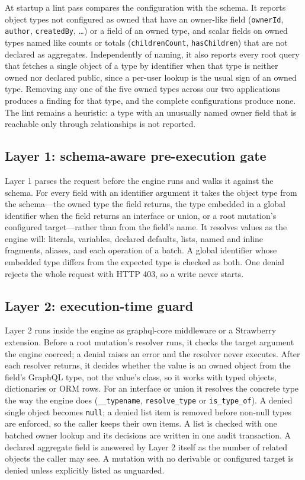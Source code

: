\documentclass[conference]{IEEEtran}
\newcommand{\code}[1]{\texttt{\small #1}}
\begin{document}
At startup a lint pass compares the configuration with the schema. It reports object types not configured as owned that have an owner-like field (\code{ownerId}, \code{author}, \code{createdBy}, \ldots) or a field of an owned type, and scalar fields on owned types named like counts or totals (\code{childrenCount}, \code{hasChildren}) that are not declared as aggregates. Independently of naming, it also reports every root query that fetches a single object of a type by identifier when that type is neither owned nor declared public, since a per-user lookup is the usual sign of an owned type. Removing any one of the five owned types across our two applications produces a finding for that type, and the complete configurations produce none. The lint remains a heuristic: a type with an unusually named owner field that is reachable only through relationships is not reported.

\subsection{Layer 1: schema-aware pre-execution gate}
Layer 1 parses the request before the engine runs and walks it against the schema. For every field with an identifier argument it takes the object type from the schema---the owned type the field returns, the type embedded in a global identifier when the field returns an interface or union, or a root mutation's configured target---rather than from the field's name. It resolves values as the engine will: literals, variables, declared defaults, lists, named and inline fragments, aliases, and each operation of a batch. A global identifier whose embedded type differs from the expected type is checked as both. One denial rejects the whole request with HTTP 403, so a write never starts.

\subsection{Layer 2: execution-time guard}
Layer 2 runs inside the engine as graphql-core middleware or a Strawberry extension. Before a root mutation's resolver runs, it checks the target argument the engine coerced; a denial raises an error and the resolver never executes. After each resolver returns, it decides whether the value is an owned object from the field's GraphQL type, not the value's class, so it works with typed objects, dictionaries or ORM rows. For an interface or union it resolves the concrete type the way the engine does (\code{\_\_typename}, \code{resolve\_type} or \code{is\_type\_of}). A denied single object becomes \code{null}; a denied list item is removed before non-null types are enforced, so the caller keeps their own items. A list is checked with one batched owner lookup and its decisions are written in one audit transaction. A declared aggregate field is answered by Layer 2 itself as the number of related objects the caller may see. A mutation with no derivable or configured target is denied unless explicitly listed as unguarded.
\end{document}
